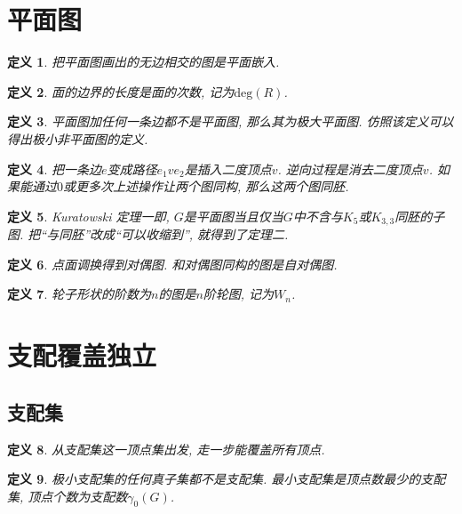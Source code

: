 \documentclass[UTF8,a4paper,11pt]{ctexart}
\newtheorem{definition}{定义}
\begin{document}
  \section{平面图}
    \begin{definition}
      把平面图画出的无边相交的图是平面嵌入.
    \end{definition}
    \begin{definition}
      面的边界的长度是面的次数, 记为$\mathrm{deg}\left(R\right)$.
    \end{definition}
    \begin{definition}
      平面图加任何一条边都不是平面图, 那么其为极大平面图.
      仿照该定义可以得出极小非平面图的定义.
    \end{definition}
    \begin{definition}
      把一条边$e$变成路径$e_1ve_2$是插入二度顶点$v$.
      逆向过程是消去二度顶点$v$.
      如果能通过$0$或更多次上述操作让两个图同构,
      那么这两个图同胚.
    \end{definition}
    \begin{definition}
      Kuratowski 定理一即, 
      $G$是平面图当且仅当$G$中不含与$K_5$或$K_{3,3}$同胚的子图.
      把``与同胚''改成``可以收缩到'', 就得到了定理二.
    \end{definition}
    \begin{definition}
      点面调换得到对偶图.
      和对偶图同构的图是自对偶图.
    \end{definition}
    \begin{definition}
      轮子形状的阶数为$n$的图是$n$阶轮图, 记为$W_n$.
    \end{definition}
  \section{支配覆盖独立}
    \subsection{支配集}
      \begin{definition}
        从支配集这一顶点集出发, 走一步能覆盖所有顶点.
      \end{definition}
      \begin{definition}
        极小支配集的任何真子集都不是支配集.
        最小支配集是顶点数最少的支配集,
        顶点个数为支配数$\gamma_0\left(G\right)$.
      \end{definition}
\end{document}
